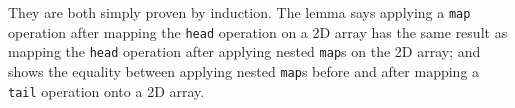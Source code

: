 \documentclass{l4proj}
\begin{document}
\begin{code}
%
\\[\AgdaEmptyExtraSkip]%
\>[0]\AgdaSpace{}%
\AgdaSymbol{:}%
\>[737I]\AgdaSymbol{\{}\AgdaSpace{}%
\AgdaSpace{}%
\AgdaSymbol{:}\AgdaSpace{}%
\AgdaSymbol{\}}\AgdaSpace{}%
\AgdaSpace{}%
\AgdaSymbol{\{}\AgdaSpace{}%
\AgdaSpace{}%
\AgdaSymbol{:}\AgdaSpace{}%
\AgdaSymbol{\}}\AgdaSpace{}%
\<%
\\
\>[.][@{}l@{}]\<[737I]%
\>[11]\AgdaSymbol{(}\AgdaSpace{}%
\AgdaSymbol{:}\AgdaSpace{}%
\AgdaSpace{}%
\AgdaSpace{}%
\AgdaSymbol{)}\AgdaSpace{}%
\AgdaSpace{}%
\AgdaSymbol{(}\AgdaSpace{}%
\AgdaSymbol{:}\AgdaSpace{}%
\AgdaSpace{}%
\AgdaSymbol{(}\AgdaSpace{}%
\AgdaSpace{}%
\AgdaSymbol{(}\AgdaSpace{}%
\AgdaSymbol{))}\AgdaSpace{}%
\AgdaSymbol{)}\AgdaSpace{}%
\<%
\\
%
\>[11]\AgdaSpace{}%
\AgdaSymbol{(}\AgdaSpace{}%
\AgdaSymbol{)}\AgdaSpace{}%
\AgdaSymbol{(}\AgdaSpace{}%
\AgdaSpace{}%
\AgdaSymbol{)}\AgdaSpace{}%
\AgdaSpace{}%
\AgdaSpace{}%
\AgdaSpace{}%
\AgdaSymbol{(}\AgdaSpace{}%
\AgdaSymbol{(}\AgdaSpace{}%
\AgdaSymbol{)}\AgdaSpace{}%
\AgdaSymbol{)}\<%
\\
\>[0]\AgdaSpace{}%
\AgdaSpace{}%
\AgdaInductiveConstructor{[]}\AgdaSpace{}%
\AgdaSymbol{=}\AgdaSpace{}%
\<%
\\
\>[0]\AgdaSpace{}%
\AgdaSpace{}%
\AgdaSymbol{((}\AgdaSpace{}%
\AgdaSpace{}%
\AgdaSymbol{)}\AgdaSpace{}%
\AgdaSpace{}%
\AgdaSymbol{)}\AgdaSpace{}%
\AgdaSymbol{=}\AgdaSpace{}%
\AgdaSpace{}%
\AgdaSymbol{(}\AgdaSpace{}%
\AgdaSpace{}%
\AgdaSpace{}%
\AgdaSymbol{)}\AgdaSpace{}%
\AgdaSymbol{(}\AgdaSpace{}%
\AgdaSpace{}%
\AgdaSymbol{)}\<%
\end{code}
They are both simply proven by induction. The  lemma says applying a \texttt{map} operation after mapping the \texttt{head} operation on a 2D array has the same result as mapping the \texttt{head} operation after applying nested \texttt{map}s on the 2D array; and  shows the equality between applying nested \texttt{map}s before and after mapping a \texttt{tail} operation onto a 2D array.
\end{document}
